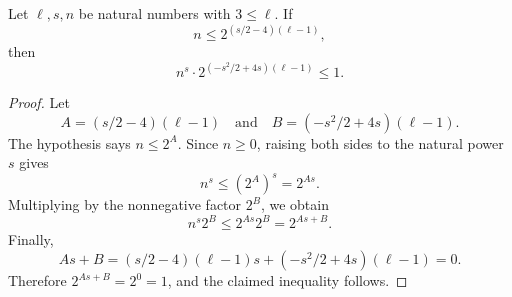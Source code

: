 \begin{helper}
Let \(\ell,s,n\) be natural numbers with \(3\le\ell\).  If
\[
  n\le 2^{(s/2-4)(\ell-1)},
\]
then
\[
  n^s\cdot 2^{(-s^2/2+4s)(\ell-1)}\le 1.
\]
\end{helper}
\begin{proof}
Let
\[
  A=(s/2-4)(\ell-1)
  \quad\text{and}\quad
  B=(-s^2/2+4s)(\ell-1).
\]
The hypothesis says \(n\le 2^A\).  Since \(n\ge0\), raising both sides to
the natural power \(s\) gives
\[
  n^s\le (2^A)^s=2^{As}.
\]
Multiplying by the nonnegative factor \(2^B\), we obtain
\[
  n^s 2^B\le 2^{As}2^B=2^{As+B}.
\]
Finally,
\[
  As+B
  =
  (s/2-4)(\ell-1)s+(-s^2/2+4s)(\ell-1)
  =0.
\]
Therefore \(2^{As+B}=2^0=1\), and the claimed inequality follows.
\end{proof}
